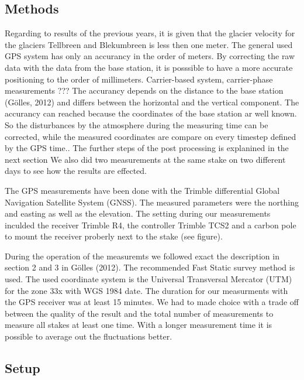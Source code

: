 
\subsection{Methods}

Regarding to results of the previous years, it is given that the glacier velocity for the glaciers Tellbreen and Blekumbreen is less then one meter.
The general used GPS system has only an accurancy in the order of meters.
By correcting the raw data with the data from the base station, it is posssible to have a more accurate positioning to the order of millimeters.
Carrier-based system, carrier-phase measurements ???
The accurancy depends on the distance to the base station (Gölles, 2012) and differs between the horizontal and the vertical component.
The accurancy can reached because the coordinates of the base station ar well known. 
So the disturbances by the atmosphere during the measuring time can be corrected, while the measured coordinates are compare on every timestep defined by the GPS time.. 
The further steps of the post processing is explanined in the next section 
We also did two measurements at the same stake on two different days to see how the results are effected.
\medskip

The GPS measurements have been done with the Trimble differential Global Navigation Satellite System (GNSS). 
The measured parameters were the northing and easting as well as the elevation.
The setting during our measurements inculded the receiver Trimble R4, the controller Trimble TCS2 and a carbon pole to mount the receiver proberly next to the stake (see figure).\medskip

During the operation of the measuremts we followed exact the description in section 2 and 3 in Gölles (2012). 
The recommended Fast Static survey method is used.
The used coordinate system is the Universal Transversal Mercator (UTM) for the zone 33x with WGS 1984 date. 
The duration for our measurments with the GPS receiver was at least 15 minutes. 
We had to made choice with a trade off between the quality of the result and the total number of measurements to measure all stakes at least one time. 
With a longer measurement time it is possible to average out the fluctuations better.


\subsection{Setup}

